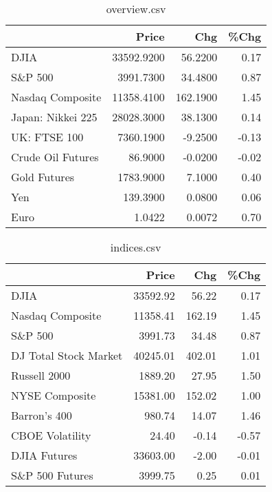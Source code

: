 \documentclass{article}%
\begin{document}
\begin{table}[htbp]%
\caption{overview.csv}%
\centering%
\begin{adjustbox}{width=1\textwidth}%
\begin{tabular}{lrrr}
\toprule
                  &      Price &      Chg &  \%Chg \\
\midrule
             DJIA & 33592.9200 &  56.2200 &  0.17 \\
          S\&P 500 &  3991.7300 &  34.4800 &  0.87 \\
 Nasdaq Composite & 11358.4100 & 162.1900 &  1.45 \\
Japan: Nikkei 225 & 28028.3000 &  38.1300 &  0.14 \\
     UK: FTSE 100 &  7360.1900 &  -9.2500 & -0.13 \\
Crude Oil Futures &    86.9000 &  -0.0200 & -0.02 \\
     Gold Futures &  1783.9000 &   7.1000 &  0.40 \\
              Yen &   139.3900 &   0.0800 &  0.06 \\
             Euro &     1.0422 &   0.0072 &  0.70 \\
\bottomrule
\end{tabular}
%
\end{adjustbox}%
\end{table}

%


\begin{table}[htbp]%
\caption{indices.csv}%
\centering%
\begin{adjustbox}{width=1\textwidth}%
\begin{tabular}{lrrr}
\toprule
                      &    Price &    Chg &  \%Chg \\
\midrule
                 DJIA & 33592.92 &  56.22 &  0.17 \\
     Nasdaq Composite & 11358.41 & 162.19 &  1.45 \\
              S\&P 500 &  3991.73 &  34.48 &  0.87 \\
DJ Total Stock Market & 40245.01 & 402.01 &  1.01 \\
         Russell 2000 &  1889.20 &  27.95 &  1.50 \\
       NYSE Composite & 15381.00 & 152.02 &  1.00 \\
         Barron's 400 &   980.74 &  14.07 &  1.46 \\
      CBOE Volatility &    24.40 &  -0.14 & -0.57 \\
         DJIA Futures & 33603.00 &  -2.00 & -0.01 \\
      S\&P 500 Futures &  3999.75 &   0.25 &  0.01 \\
\bottomrule
\end{tabular}
%
\end{adjustbox}%
\end{table}
\end{document}
